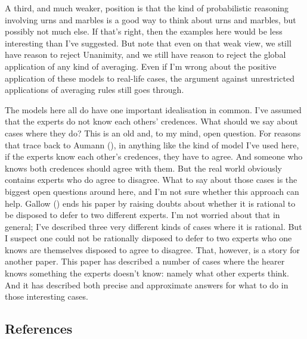 \documentclass[
  11pt,
  letterpaper,
  DIV=11,
  numbers=noendperiod,
  twoside]{scrartcl}
\begin{document}
A third, and much weaker, position is that the kind of probabilistic
reasoning involving urns and marbles is a good way to think about urns
and marbles, but possibly not much else. If that's right, then the
examples here would be less interesting than I've suggested. But note
that even on that weak view, we still have reason to reject Unanimity,
and we still have reason to reject the global application of any kind of
averaging. Even if I'm wrong about the positive application of these
models to real-life cases, the argument against unrestricted
applications of averaging rules still goes through.

The models here all do have one important idealisation in common. I've
assumed that the experts do not know each others' credences. What should
we say about cases where they do? This is an old and, to my mind, open
question. For reasons that trace back to Aumann
(), in anything like the kind of model
I've used here, if the experts know each other's credences, they have to
agree. And someone who knows both credences should agree with them. But
the real world obviously contains experts who do agree to disagree. What
to say about those cases is the biggest open questions around here, and
I'm not sure whether this approach can help. Gallow
() ends his paper by raising doubts about
whether it is rational to be disposed to defer to two different experts.
I'm not worried about that in general; I've described three very
different kinds of cases where it is rational. But I suspect one could
not be rationally disposed to defer to two experts who one knows are
themselves disposed to agree to disagree. That, however, is a story for
another paper. This paper has described a number of cases where the
hearer knows something the experts doesn't know: namely what other
experts think. And it has described both precise and approximate answers
for what to do in those interesting cases.

\subsection*{References}\label{references}
\end{document}
